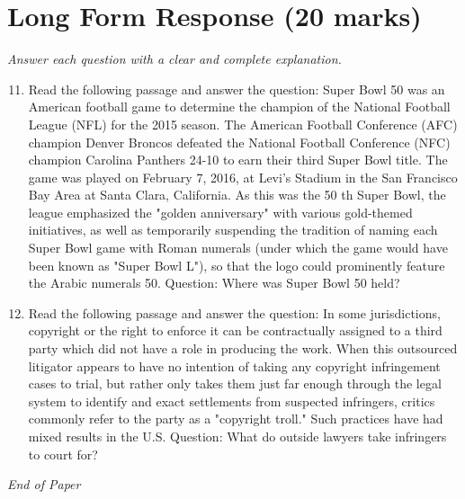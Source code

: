 \documentclass[12pt]{article}
\begin{document}
\section*{Long Form Response (20 marks)}
\textit{Answer each question with a clear and complete explanation.}
\begin{enumerate}[label=\arabic*.]
\setcounter{enumi}{10}
\item Read the following passage and answer the question: Super Bowl 50 was an American football game to determine the champion of the National Football League (NFL) for the 2015 season. The American Football Conference (AFC) champion Denver Broncos defeated the National Football Conference (NFC) champion Carolina Panthers 24-10 to earn their third Super Bowl title. The game was played on February 7, 2016, at Levi's Stadium in the San Francisco Bay Area at Santa Clara, California. As this was the 50 th Super Bowl, the league emphasized the "golden anniversary" with various gold-themed initiatives, as well as temporarily suspending the tradition of naming each Super Bowl game with Roman numerals (under which the game would have been known as "Super Bowl L"), so that the logo could prominently feature the Arabic numerals 50. Question: Where was Super Bowl 50 held?
\item Read the following passage and answer the question: In some jurisdictions, copyright or the right to enforce it can be contractually assigned to a third party which did not have a role in producing the work. When this outsourced litigator appears to have no intention of taking any copyright infringement cases to trial, but rather only takes them just far enough through the legal system to identify and exact settlements from suspected infringers, critics commonly refer to the party as a "copyright troll." Such practices have had mixed results in the U.S. Question: What do outside lawyers take infringers to court for?
\end{enumerate}

\vfill
\noindent\textit{End of Paper}
\end{document}
